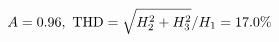 \documentclass[preview]{standalone}
\begin{document}
\begin{align*}
\special{dvisvgm:raw <g id='unique000'>}A=0.96,\ \text{THD}=\sqrt{H_2^2+H_3^2}/H_1=17.0\%\special{dvisvgm:raw </g>}
\end{align*}
\end{document}
